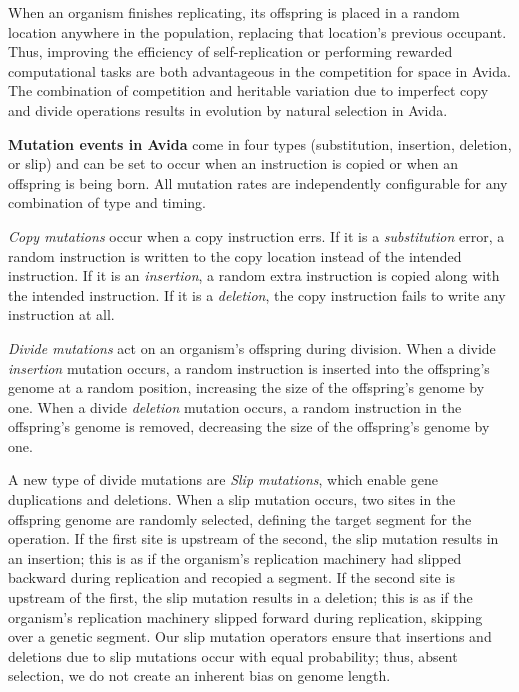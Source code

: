 When an organism finishes replicating, its offspring is placed in a random location anywhere in the population, replacing that location's previous occupant.
Thus, improving the efficiency of self-replication or performing rewarded computational tasks are both advantageous in the competition for space in Avida. The combination of competition and heritable variation due to imperfect copy and divide operations results in evolution by natural selection in Avida.



\medskip
\noindent
\textbf{Mutation events in Avida} come in four types (substitution, insertion, deletion, or slip) and can be set to occur when an instruction is copied or when an offspring is being born.  All mutation rates are independently configurable for any combination of type and timing.

\textit{Copy mutations} occur when a copy instruction errs.  If it is a \textit{substitution} error, a random instruction is written to the copy location instead of the intended instruction.  If it is an \textit{insertion}, a random extra instruction is copied along with the intended instruction.  If it is a \textit{deletion}, the copy instruction fails to write any instruction at all. %

\textit{Divide mutations} act on an organism's offspring during division. When a divide \textit{insertion} mutation occurs, a random instruction is inserted into the offspring's genome at a random position, increasing the size of the offspring's genome by one. When a divide \textit{deletion} mutation occurs, a random instruction in the offspring's genome is removed, decreasing the size of the offspring's genome by one. %

A new type of divide mutations are \textit{Slip mutations}, which enable gene duplications and deletions. When a slip mutation occurs, two sites in the offspring genome are randomly selected, defining the target segment for the operation. If the first site is upstream of the second, the slip mutation results in an insertion; this is as if the organism's replication machinery had slipped backward during replication and recopied a segment. If the second site is upstream of the first, the slip mutation results in a deletion; this is as if the organism's replication machinery slipped forward during replication, skipping over a genetic segment. Our slip mutation operators ensure that insertions and deletions due to slip mutations occur with equal probability; thus, absent selection, we do not create an inherent bias on genome length.

